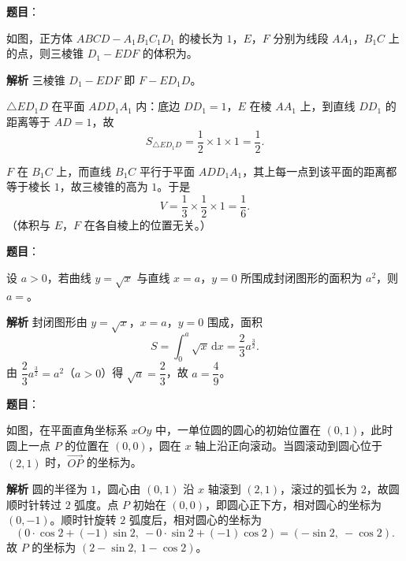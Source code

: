\begin{answer}

\textbf{题目}：

如图，正方体 $ABCD-A_1B_1C_1D_1$ 的棱长为 $1$，$E$，$F$ 分别为线段 $AA_1$，$B_1C$ 上的点，则三棱锥 $D_1-EDF$ 的体积为\gkblank{}。
\nopagebreak[4]
\begin{center}\end{center}
\nopagebreak[4]
\textbf{解析}
三棱锥 $D_1-EDF$ 即 $F-ED_1D$。

$\triangle ED_1D$ 在平面 $ADD_1A_1$ 内：底边 $DD_1=1$，$E$ 在棱 $AA_1$ 上，到直线 $DD_1$ 的距离等于 $AD=1$，故
\nopagebreak[4]
\[S_{\triangle ED_1D}=\frac12\times1\times1=\frac12.\]

$F$ 在 $B_1C$ 上，而直线 $B_1C$ 平行于平面 $ADD_1A_1$，其上每一点到该平面的距离都等于棱长 $1$，故三棱锥的高为 $1$。于是
\nopagebreak[4]
\[V=\frac13\times\frac12\times1=\frac16.\]
（体积与 $E$，$F$ 在各自棱上的位置无关。）


\end{answer}
\begin{answer}

\textbf{题目}：

设 $a>0$，若曲线 $y=\sqrt x$ 与直线 $x=a$，$y=0$ 所围成封闭图形的面积为 $a^2$，则 $a=$\gkblank{}。

\textbf{解析}
封闭图形由 $y=\sqrt x$，$x=a$，$y=0$ 围成，面积
\nopagebreak[4]
\[S=\int_0^a\sqrt x\,\mathrm dx=\frac23a^{\frac32}.\]
由 $\dfrac23a^{\frac32}=a^2$（$a>0$）得 $\sqrt a=\dfrac23$，故 $a=\dfrac49$。


\end{answer}
\begin{answer}

\textbf{题目}：

如图，在平面直角坐标系 $xOy$ 中，一单位圆的圆心的初始位置在 $(0,1)$，此时圆上一点 $P$ 的位置在 $(0,0)$，圆在 $x$ 轴上沿正向滚动。当圆滚动到圆心位于 $(2,1)$ 时，$\overrightarrow{OP}$ 的坐标为\gkblank{}。
\nopagebreak[4]
\begin{center}\end{center}
\nopagebreak[4]
\textbf{解析}
圆的半径为 $1$，圆心由 $(0,1)$ 沿 $x$ 轴滚到 $(2,1)$，滚过的弧长为 $2$，故圆顺时针转过 $2$ 弧度。点 $P$ 初始在 $(0,0)$，即圆心正下方，相对圆心的坐标为 $(0,-1)$。顺时针旋转 $2$ 弧度后，相对圆心的坐标为
\nopagebreak[4]
\[(0\cdot\cos2+(-1)\sin2,\ -0\cdot\sin2+(-1)\cos2)=(-\sin2,\ -\cos2).\]
故 $P$ 的坐标为 $(2-\sin2,\ 1-\cos2)$。


\end{answer}

